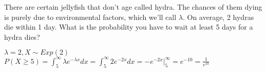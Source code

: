 \question There are certain jellyfish that don’t age called hydra. The 
chances of them dying is purely due to environmental factors, which 
we’ll call $\lambda$. On average, 2 hydras die within 1 day.
What is the probability you have to wait at least 5 days for a 
hydra dies?
\begin{solution}[1cm]
$\lambda = 2, X \sim Exp(2)$ \\
$P(X\geq 5) = \int_5^\infty \lambda e^{-\lambda x} dx = \int_5^\infty 
2e^{-2x} dx = -e^{-2x} |_5^\infty = e^{-10} = \frac{1}{e^{10}}$
\end{solution}

